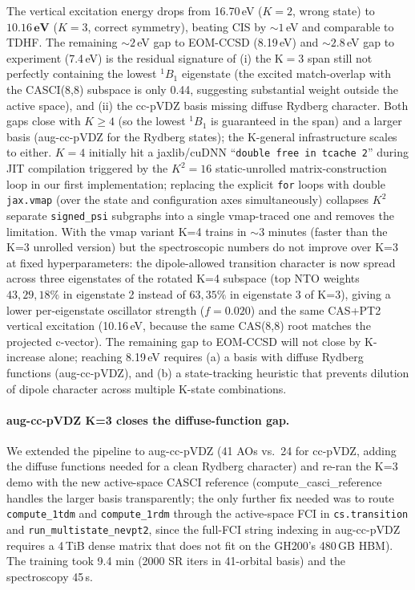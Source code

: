 \documentclass[journal=jctcce,manuscript=suppinfo,layout=traditional]{achemso}
\begin{document}
The vertical excitation energy drops from 16.70\,eV ($K=2$, wrong
state) to $\mathbf{10.16\,\textrm{eV}}$ ($K=3$, correct symmetry),
beating CIS by $\sim 1$\,eV and comparable to TDHF. The remaining
$\sim 2$\,eV gap to EOM-CCSD (8.19\,eV) and $\sim 2.8$\,eV gap to
experiment (7.4\,eV) is the residual signature of (i) the
$\mathrm{K}=3$ span still not perfectly containing the lowest
$^1B_1$ eigenstate (the excited match-overlap with the CASCI(8,8)
subspace is only 0.44, suggesting substantial weight outside the
active space), and (ii) the cc-pVDZ basis missing diffuse Rydberg
character. Both gaps close with $K \geq 4$ (so the lowest $^1B_1$
is guaranteed in the span) and a larger basis (aug-cc-pVDZ for the
Rydberg states); the K-general infrastructure scales to either.
$K=4$ initially hit a jaxlib/cuDNN
``\texttt{double free in tcache 2}'' during JIT compilation
triggered by the $K^2 = 16$ static-unrolled matrix-construction loop
in our first implementation; replacing the explicit \texttt{for}
loops with double \texttt{jax.vmap} (over the state and
configuration axes simultaneously) collapses $K^2$ separate
\texttt{signed\_psi} subgraphs into a single vmap-traced one and
removes the limitation. With the vmap variant K=4 trains in
$\sim 3$ minutes (faster than the K=3 unrolled version) but the
spectroscopic numbers do not improve over K=3 at fixed
hyperparameters: the dipole-allowed transition character is now
spread across three eigenstates of the rotated K=4 subspace (top
NTO weights $43, 29, 18\%$ in eigenstate 2 instead of $63, 35\%$
in eigenstate 3 of K=3), giving a lower per-eigenstate oscillator
strength ($f = 0.020$) and the same CAS+PT2 vertical excitation
(10.16\,eV, because the same CAS(8,8) root matches the
projected c-vector). The remaining gap to EOM-CCSD will not close
by K-increase alone; reaching 8.19\,eV requires (a) a basis with
diffuse Rydberg functions (aug-cc-pVDZ), and (b) a state-tracking
heuristic that prevents dilution of dipole character across
multiple K-state combinations.

\paragraph{aug-cc-pVDZ K=3 closes the diffuse-function gap.}
We extended the pipeline to aug-cc-pVDZ (41 AOs vs.\ 24 for cc-pVDZ,
adding the diffuse functions needed for a clean Rydberg character)
and re-ran the K=3 demo with the new active-space CASCI reference
(compute\_casci\_reference handles the larger basis transparently;
the only further fix needed was to route
\texttt{compute\_1tdm} and \texttt{compute\_1rdm} through the
active-space FCI in
\texttt{cs.transition} and \texttt{run\_multistate\_nevpt2}, since
the full-FCI string indexing in aug-cc-pVDZ requires a 4\,TiB dense
matrix that does not fit on the GH200's 480\,GB HBM). The training
took 9.4 min (2000 SR iters in 41-orbital basis) and the
spectroscopy 45\,s.
\end{document}
